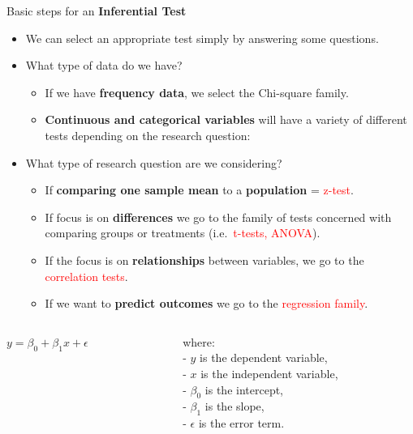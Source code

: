 \documentclass[
  ignorenonframetext,
]{beamer}
\providecommand{\tightlist}{%
  \setlength{\itemsep}{0pt}\setlength{\parskip}{0pt}}
\begin{document}
\begin{frame}{Basic steps for an \textbf{Inferential Test}}
\label{basic-steps-for-an-inferential-test-1}
\begin{itemize}
\item
  We can select an appropriate test simply by answering some questions.
\item
  What type of data do we have?

  \begin{itemize}
  \tightlist
  \item
    If we have \textbf{frequency data}, we select the Chi-square family.
  \item
    \textbf{Continuous and categorical variables} will have a variety of
    different tests depending on the research question:
  \end{itemize}
\item
  What type of research question are we considering?

  \begin{itemize}
  \tightlist
  \item
    If \textbf{comparing one sample mean} to a \textbf{population} =
    \textcolor{red}{z-test}.
  \item
    If focus is on \textbf{differences} we go to the family of tests
    concerned with comparing groups or treatments
    (i.e.~\textcolor{red}{t-tests, ANOVA}).
  \item
    If the focus is on \textbf{relationships} between variables, we go
    to the \textcolor{red}{correlation tests}.
  \item
    If we want to \textbf{predict outcomes} we go to the
    \textcolor{red}{regression family}.
  \end{itemize}
\end{itemize}

\begin{columns}[T]
\begin{column}{0.4\textwidth}
\centering

\(y = \beta_0 + \beta_1 x + \epsilon\)
\end{column}

\begin{column}{0.6\textwidth}
where:\\
- \(y\) is the dependent variable,\\
- \(x\) is the independent variable,\\
- \(\beta_0\) is the intercept,\\
- \(\beta_1\) is the slope,\\
- \(\epsilon\) is the error term.
\end{column}
\end{columns}
\end{frame}
\end{document}
